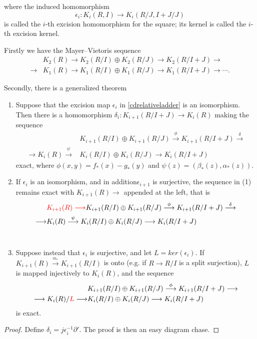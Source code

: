	where the induced homomorphism 
	\[\epsilon_i \colon K_i(R,I) \longrightarrow K_i(R/J,I+J/J)\]
is called the $i$-th excision homomorphism for the square; its kernel is called the $i$-th excision kernel.

	Firstly we have the Mayer–Vietoris sequence
	\begin{align*}
	&K_2(R)\longrightarrow K_2(R/I)\oplus K_2(R/J)\longrightarrow K_2(R/I+J) \longrightarrow \\
	\longrightarrow &K_1(R) \longrightarrow K_1(R/I)\oplus K_1(R/J)\longrightarrow K_1(R/I+J)\longrightarrow \cdots.
	\end{align*}
	
	Secondly, there is a generalized theorem
	\begin{theorem}
	\begin{enumerate}
		\item  Suppose that the excision map $\epsilon_i$ in \ref{cdrelativeladder} is an isomorphism. Then there is a homomorphism $\delta_i \colon K_{i+1}(R/I+J)\longrightarrow K_i(R)$ making the sequence 
		\begin{align*}
		&K_{i+1}(R/I)\oplus K_{i+1}(R/J)\overset{\phi}\longrightarrow K_{i+1}(R/I+J)\overset{\delta} \longrightarrow \\
	\longrightarrow K_i(R) \overset{\psi}\longrightarrow & K_i(R/I)\oplus K_i(R/J)\longrightarrow K_i(R/I+J)
		\end{align*}	
exact, where $\phi(x,y)=f_*(x)-g_*(y)$ and $\psi(z)=(\beta_*(z),\alpha_*(z))$. \\
	\item If $\epsilon_i$ is an isomorphism, and in addition$\epsilon_{i+1}$ is surjective, the sequence in (1) remains exact with $K_{i+1}(R)\longrightarrow$  appended at the left, that is
	\begin{align*}
		&{\color{red} K_{i+1}(R) \longrightarrow} K_{i+1}(R/I)\oplus K_{i+1}(R/J)\overset{\phi}\longrightarrow K_{i+1}(R/I+J)\overset{\delta} \longrightarrow \\
	\longrightarrow &K_i(R) \overset{\psi}\longrightarrow K_i(R/I)\oplus K_i(R/J)\longrightarrow K_i(R/I+J)
		\end{align*} \\
	\item Suppose instead  that $\epsilon_i$  is  surjective,  and  let  $L =  ker(\epsilon_i)$. If
$K_{i+1}(R) \overset{\alpha_*}\longrightarrow K_{i+1}(R/I) $ is onto (e.g.  if $ R \longrightarrow  R/I$ is a split surjection), $L$ is mapped
injectively to $K_i(R)$, and the sequence
\begin{align*}
		&K_{i+1}(R/I)\oplus K_{i+1}(R/J)\overset{\phi}\longrightarrow K_{i+1}(R/I+J) \longrightarrow \\
	\longrightarrow K_i(R)/{\color{red}L} \longrightarrow & K_i(R/I)\oplus K_i(R/J)\longrightarrow K_i(R/I+J)
		\end{align*}
is exact.
	\end{enumerate}
	\end{theorem}
\begin{proof}
	Define  $\delta_i=j \epsilon_i^{-1}\partial'$. The proof is then an easy diagram chase.
\end{proof}

